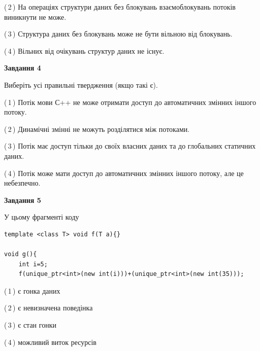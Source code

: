 \documentclass[12pt, ukrainian]{article}
\begin{document}
\begin {large}
{(\,2\,) На операціях структури даних без блокувань взаємоблокувань потоків виникнути не може.%

(\,3\,) Структура даних без блокувань може не бути вільною від блокувань.%

(\,4\,) Вільних від очікувань структур даних не існує.%



\begin{center}
\textbf{Завдання 4}
\end{center}
Виберіть усі правильні твердження (якщо такі є).\par


(\,1\,) Потік мови С++ не може отримати доступ до автоматичних змінних іншого потоку.%

(\,2\,) Динамічні змінні не можуть розділятися між потоками.%

(\,3\,) Потік має доступ тільки до своїх власних даних та до глобальних статичних даних.%

(\,4\,) Потік може мати доступ до автоматичних змінних іншого потоку, але це небезпечно.%



\begin{center}
\textbf{Завдання 5}
\end{center}
У цьому фрагменті коду
\begin{verbatim}
template <class T> void f(T a){}

void g(){
    int i=5;
    f(unique_ptr<int>(new int(i)))+(unique_ptr<int>(new int(35)));
\end{verbatim}
(\,1\,) є гонка даних%

(\,2\,) є невизначена поведінка%

(\,3\,) є стан гонки%

(\,4\,) можливий виток ресурсів%


}
\end {large}
\end{document}
